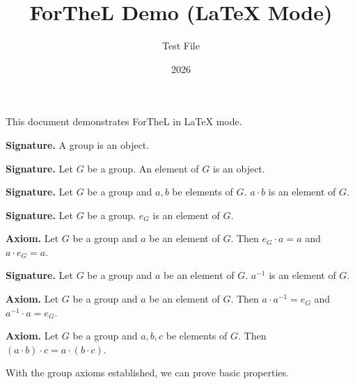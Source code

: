 \documentclass{article}
\title{ForTheL Demo (LaTeX Mode)}
\author{Test File}
\date{2026}
\newenvironment{forthel}{}{}
\newenvironment{signature}{\noindent\textbf{Signature.}}{}
\newenvironment{axiom}{\noindent\textbf{Axiom.}}{}
\begin{document}
\maketitle

This document demonstrates ForTheL in LaTeX mode.

\begin{forthel}
  \begin{signature}
    A group is an object.
  \end{signature}

  \begin{signature}
    Let $G$ be a group.
    An element of $G$ is an object.
  \end{signature}

  \begin{signature}
    Let $G$ be a group and $a, b$ be elements of $G$.
    $a \cdot b$ is an element of $G$.
  \end{signature}

  \begin{signature}
    Let $G$ be a group.
    $e_G$ is an element of $G$.
  \end{signature}

  \begin{axiom}
    Let $G$ be a group and $a$ be an element of $G$.
    Then $e_G \cdot a = a$ and $a \cdot e_G = a$.
  \end{axiom}

  \begin{signature}
    Let $G$ be a group and $a$ be an element of $G$.
    $a^{-1}$ is an element of $G$.
  \end{signature}

  \begin{axiom}
    Let $G$ be a group and $a$ be an element of $G$.
    Then $a \cdot a^{-1} = e_G$ and $a^{-1} \cdot a = e_G$.
  \end{axiom}

  \begin{axiom}
    Let $G$ be a group and $a, b, c$ be elements of $G$.
    Then $(a \cdot b) \cdot c = a \cdot (b \cdot c)$.
  \end{axiom}
\end{forthel}

With the group axioms established, we can prove basic properties.
\end{document}
